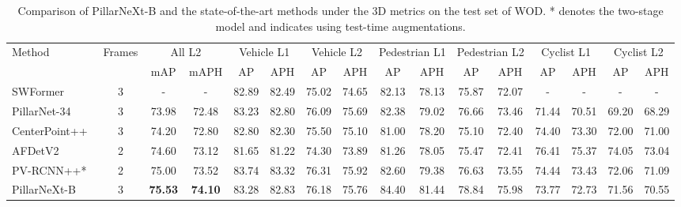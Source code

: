 \documentclass[10pt,twocolumn,letterpaper]{article}
\begin{document}
\begin{table*}[t]
\centering
\setlength{\tabcolsep}{1.5pt}
\begin{tabular}{l|c|cc|cc|cc|cc|cc|cc|cc}
\hline
\multirow{2}{*}{Method} &  \multirow{2}{*}{Frames} &   \multicolumn{2}{c|}{All L2}  & \multicolumn{2}{c|}{Vehicle L1} & \multicolumn{2}{c|}{Vehicle L2} & \multicolumn{2}{c|}{Pedestrian L1} & \multicolumn{2}{c|}{Pedestrian L2} & \multicolumn{2}{c|}{Cyclist L1} & \multicolumn{2}{c}{Cyclist L2} \\  
                        &                  &  mAP & mAPH   & AP            & APH           & AP            & APH           & AP           & APH         & AP           & APH         & AP           & APH         & AP           & APH         \\ \hline
SWFormer~\cite{sun2022swformer}   & 3 & -  & - & 82.89   & 82.49 & 75.02& 74.65 & 82.13& 78.13 & 75.87& 72.07&  - & - & - & - \\ 
PillarNet-34~\cite{shi2022pillarnet} &   3 &  73.98 & 72.48  &  83.23 &82.80 &76.09 &75.69 &82.38 &79.02 &76.66& 73.46 &71.44 &70.51 &69.20 &68.29 \\ 
CenterPoint++\cite{yin2021center} & 3  &  74.20  & 72.80 & 82.80 & 82.30 &  75.50 & 75.10  & 81.00 & 78.20 &  75.10 & 72.40 &  74.40 & 73.30  & 72.00 & 71.00 \\
AFDetV2~\cite{hu2022afdetv2}  & 2 &  74.60   & 73.12 & 81.65 & 81.22  & 74.30 & 73.89  & 81.26 & 78.05  & 75.47 & 72.41 &  76.41 & 75.37  & 74.05 & 73.04 \\ 
PV-RCNN++*~\cite{shi2021pv}   & 2  &  75.00  & 73.52  & 83.74 &83.32& 76.31 &75.92 &82.60& 79.38 &76.63 &73.55 &74.44 &73.43 &72.06 &71.09 \\ PillarNeXt-B  &  3  & \textbf{75.53}   & \textbf{74.10} & 83.28 & 82.83 & 76.18 & 75.76 & 84.40 & 81.44 &  78.84 & 75.98 & 73.77 & 72.73 & 71.56 & 70.55 \\ \hline
\end{tabular}
\vspace{-2mm}
\caption{Comparison of PillarNeXt-B and the state-of-the-art methods under the 3D metrics on the test set of WOD. * denotes the two-stage model and  indicates using test-time augmentations.}
\vspace{-1mm}
\label{exp:waymotest}
\end{table*}
\end{document}
